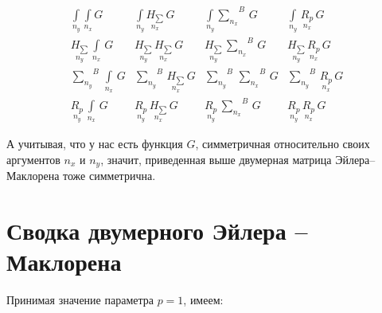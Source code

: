 \documentclass[11pt]{article}
\begin{document}
    \begin{equation}
\begin{array}{cccc}
 \int\limits_{n_y}^{} \int\limits_{n_x}^{} G  &  \int\limits_{n_y}^{} \underset{n_x}{H_{\sum}}\,G  &  \int\limits_{n_y}^{}{\sum\limits_{n_x}^{}}^{B}\,G  &  \int\limits_{n_y}^{}\,\underset{n_x}{R_{p}}\,G  \\
 \underset{n_y}{H_{\sum}}\,\int\limits_{n_x}^{}\,G &  \underset{n_y}{H_{\sum}}\,\underset{n_x}{H_{\sum}}\,G &  \underset{n_y}{H_{\sum}}\,{\sum\limits_{n_x}^{}}^{B}\,G &  \underset{n_y}{H_{\sum}}\,\underset{n_x}{R_{p}}\,G \\
 {\sum\limits_{n_y}^{}}^{B}\,\int\limits_{n_x}^{}\,G  &  {\sum\limits_{n_y}^{}}^{B}\,\underset{n_x}{H_{\sum}}\,G  &  {\sum\limits_{n_y}^{}}^{B}\,{\sum\limits_{n_x}^{}}^{B}\,G  &  {\sum\limits_{n_y}^{}}^{B}\,\underset{n_x}{R_{p}}\,G  \\
 \underset{n_y}{R_{p}}\,\int\limits_{n_x}^{}\,G   &  \underset{n_y}{R_{p}}\,\underset{n_x}{H_{\sum}}\,G   &  \underset{n_y}{R_{p}}\,{\sum\limits_{n_x}^{}}^{B}\,G   &  \underset{n_y}{R_{p}}\,\underset{n_x}{R_{p}}\,G
\end{array}\end{equation}

    А учитывая, что у нас есть функция \(G\), симметричная относительно
своих аргументов \(n_x\) и \(n_y\), значит, приведенная выше двумерная
матрица Эйлера--Маклорена тоже симметрична.

    \section{Сводка двумерного Эйлера --
Маклорена}\label{ux441ux432ux43eux434ux43aux430-ux434ux432ux443ux43cux435ux440ux43dux43eux433ux43e-ux44dux439ux43bux435ux440ux430-ux43cux430ux43aux43bux43eux440ux435ux43dux430}

Принимая значение параметра \(p = 1\), имеем:
\end{document}

